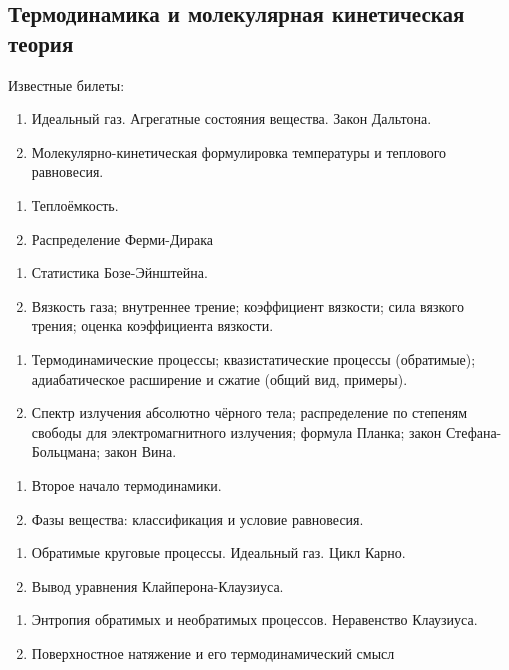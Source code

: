 \documentclass{article}
\newcounter{ticket}[subsection]
\newenvironment{ticket}[1][]{\item[Билет \ifthenelse{\equal{#1}{}}{}{\setcounter{ticket}{#1}}\theticket\refstepcounter{ticket}:]\phantom{}\begin{enumerate}}{\end{enumerate}}
\begin{document}
\subsection*{Термодинамика и молекулярная кинетическая теория}
Известные билеты:
\begin{description}
	\begin{ticket}[3]
		\item Идеальный газ. Агрегатные состояния вещества.
		      Закон Дальтона.
		\item Молекулярно-кинетическая формулировка температуры
		      и теплового равновесия.
	\end{ticket}
	\begin{ticket}
		\item Теплоёмкость.
		\item Распределение Ферми-Дирака
	\end{ticket}
	\begin{ticket}[9]
		\item Статистика Бозе-Эйнштейна.
		\item Вязкость газа; внутреннее трение; коэффициент вязкости;
		      сила вязкого трения; оценка коэффициента вязкости.
	\end{ticket}
	\begin{ticket}
		\item Термодинамические процессы; квазистатические процессы
		      (обратимые); адиабатическое расширение и сжатие
		      (общий вид, примеры).
		\item Спектр излучения абсолютно чёрного тела; распределение
		      по степеням свободы для электромагнитного излучения;
		      формула Планка; закон Стефана-Больцмана; закон Вина.
	\end{ticket}
	\begin{ticket}[13]
		\item Второе начало термодинамики.
		\item Фазы вещества: классификация и условие равновесия.
	\end{ticket}
	\begin{ticket}
		\item Обратимые круговые процессы. Идеальный газ. Цикл Карно.
		\item Вывод уравнения Клайперона-Клаузиуса.
	\end{ticket}
	\begin{ticket}[17]
		\item Энтропия обратимых и необратимых процессов.
		      Неравенство Клаузиуса.
		\item Поверхностное натяжение и его термодинамический смысл

\end{ticket}
\end{description}
\end{document}
